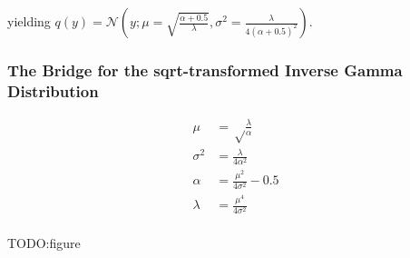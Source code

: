 yielding $q(y) = \mathcal{N}(y; \mu = \sqrt{\frac{\alpha+0.5}{\lambda}}, \sigma^2 = \frac{\lambda}{4 (\alpha+0.5)^2})$. 

\subsubsection{The Bridge for the sqrt-transformed Inverse Gamma Distribution}

\begin{align}
\mu &= \sqrt\frac{\lambda}{\alpha} \\
\sigma^2 &= \frac{\lambda}{4\alpha^2} \\
\alpha &= \frac{\mu^2}{4\sigma^2}-0.5\\
\lambda &= \frac{\mu^4}{4\sigma^2}\\
\end{align}

TODO:figure
